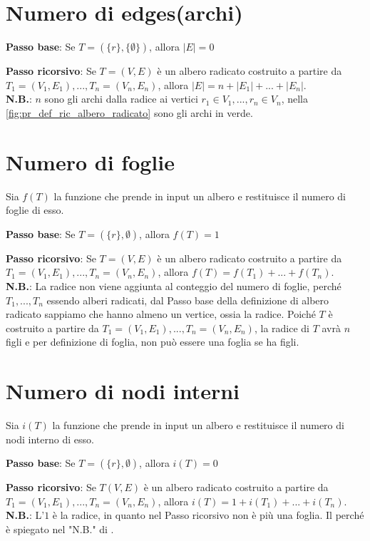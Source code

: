 \section{Numero di edges(archi)}
\textbf{Passo base}: Se $T=(\{r\}, \{\emptyset\})$, allora $|E| = 0$

\textbf{Passo ricorsivo}: Se $T=(V, E)$ è un albero radicato costruito a partire da $T_1=(V_1, E_1), ..., T_n=(V_n, E_n)$, allora $|E| = n + |E_1| + ... + |E_n|$. \\
\textbf{N.B.}: $n$ sono gli archi dalla radice ai vertici $r_1 \in V_1, ..., r_n \in V_n$, nella \autoref{fig:pr_def_ric_albero_radicato} sono gli archi in verde.

\section{Numero di foglie}
\label{sec:albero_radicato_num_foglie}
Sia $f(T)$ la funzione che prende in input un albero e restituisce il numero di foglie di esso.

\textbf{Passo base}: Se $T=(\{r\}, \emptyset)$, allora $f(T) = 1$

\textbf{Passo ricorsivo}: Se $T=(V, E)$ è un albero radicato costruito a partire da $T_1=(V_1, E_1), ..., T_n=(V_n, E_n)$, allora $f(T) = f(T_1) + ... + f(T_n)$. \\
\textbf{N.B.}: La radice non viene aggiunta al conteggio del numero di foglie, perché $T_1, ..., T_n$ essendo alberi radicati, dal Passo base della definizione di albero radicato sappiamo che hanno almeno un vertice, ossia la radice. Poiché $T$ è costruito a partire da $T_1=(V_1, E_1), ..., T_n=(V_n, E_n)$, la radice di $T$ avrà $n$ figli e per definizione di foglia, non può essere una foglia se ha figli. 

\section{Numero di nodi interni}
Sia $i(T)$ la funzione che prende in input un albero e restituisce il numero di nodi interno di esso.

\textbf{Passo base}: Se $T=(\{r\}, \emptyset)$, allora $i(T) = 0$

\textbf{Passo ricorsivo}: Se $T(V, E)$ è un albero radicato costruito a partire da $T_1=(V_1, E_1), ..., T_n=(V_n, E_n)$, allora $i(T) = 1 + i(T_1) + ... + i(T_n)$. \\
\textbf{N.B.}: L'$1$ è la radice, in quanto nel Passo ricorsivo non è più una foglia. Il perché è spiegato nel "N.B." di .

